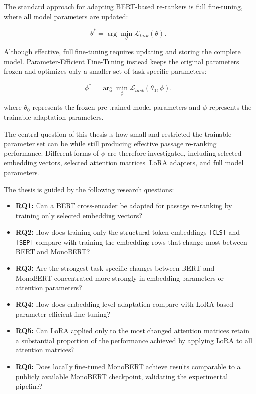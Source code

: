 The standard approach for adapting BERT-based re-rankers is full fine-tuning, where all model parameters are updated:

\begin{equation}
    \theta^\ast = \arg\min_{\theta} \mathcal{L}_{task}(\theta).
    \label{eq:full_finetune_objective}
\end{equation}

Although effective, full fine-tuning requires updating and storing the complete model. Parameter-Efficient Fine-Tuning instead keeps the original parameters frozen and optimizes only a smaller set of task-specific parameters:

\begin{equation}
    \phi^\ast = \arg\min_{\phi} \mathcal{L}_{task}(\theta_0,\phi).
    \label{eq:peft_objective}
\end{equation}

where $\theta_0$ represents the frozen pre-trained model parameters and $\phi$ represents the trainable adaptation parameters.

The central question of this thesis is how small and restricted the trainable parameter set can be while still producing effective passage re-ranking performance. Different forms of $\phi$ are therefore investigated, including selected embedding vectors, selected attention matrices, LoRA adapters, and full model parameters.

The thesis is guided by the following research questions:

\begin{itemize}

    \item \textbf{RQ1:} Can a BERT cross-encoder be adapted for passage re-ranking by training only selected embedding vectors?

    \item \textbf{RQ2:} How does training only the structural token embeddings \texttt{[CLS]} and \texttt{[SEP]} compare with training the embedding rows that change most between BERT and MonoBERT?

    \item \textbf{RQ3:} Are the strongest task-specific changes between BERT and MonoBERT concentrated more strongly in embedding parameters or attention parameters?

    \item \textbf{RQ4:} How does embedding-level adaptation compare with LoRA-based parameter-efficient fine-tuning?

    \item \textbf{RQ5:} Can LoRA applied only to the most changed attention matrices retain a substantial proportion of the performance achieved by applying LoRA to all attention matrices?

    \item \textbf{RQ6:} Does locally fine-tuned MonoBERT achieve results comparable to a publicly available MonoBERT checkpoint, validating the experimental pipeline?

\end{itemize}

